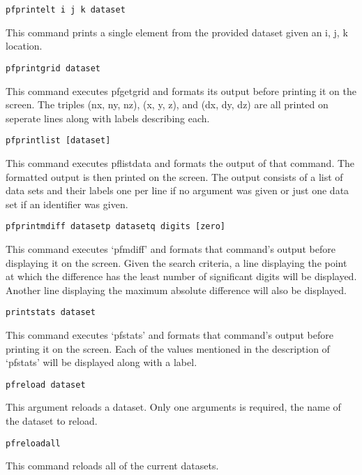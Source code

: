 \begin{description}
\item{\begin{verbatim}pfprintelt i j k dataset\end{verbatim}}
This command prints a single element from the provided dataset given an i, j, k location.

\item{\begin{verbatim}pfprintgrid dataset\end{verbatim}}
This command executes pfgetgrid and formats its output before printing
it on the screen.  The triples (nx, ny, nz), (x, y, z), and
(dx, dy, dz) are all printed on seperate lines along with labels
describing each.


\item{\begin{verbatim}pfprintlist [dataset]\end{verbatim}}
This command executes pflistdata and formats the output of that
command.  The formatted output is then printed on the screen.  The
output consists of a list of data sets and their labels one per line
if no argument was given or just one data set if an identifier was
given.


\item{\begin{verbatim}pfprintmdiff datasetp datasetq digits [zero]\end{verbatim}}
This command executes `pfmdiff' and formats that command's output
before displaying it on the screen.  Given the search criteria, a line
displaying the point at which the difference has the least number of
significant digits will be displayed.  Another line displaying the
maximum absolute difference will also be displayed.


\item{\begin{verbatim}printstats dataset\end{verbatim}}
This command executes `pfstats' and formats that command's output
before printing it on the screen.  Each of the values mentioned in the
description of `pfstats' will be displayed along with a label.


\item{\begin{verbatim}pfreload dataset\end{verbatim}}
This argument reloads a dataset. Only one arguments is required, the name of the dataset to reload.

\item{\begin{verbatim}pfreloadall\end{verbatim}}
This command reloads all of the current datasets.


\end{description}
